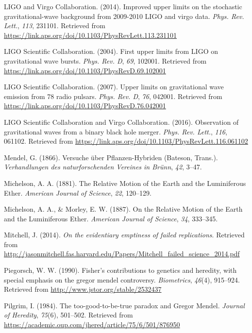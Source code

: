 \documentclass[english,floatsintext,man]{apa6}
\theoremstyle{definition}
\theoremstyle{definition}
\theoremstyle{definition}
\theoremstyle{remark}
\begin{document}
\hypertarget{ref-LIGO:2014}{}
LIGO and Virgo Collaboration. (2014). Improved upper limits on the
stochastic gravitational-wave background from 2009-2010 LIGO and virgo
data. \emph{Phys. Rev. Lett.}, \emph{113}, 231101. Retrieved from
\url{https://link.aps.org/doi/10.1103/PhysRevLett.113.231101}

\hypertarget{ref-LIGO:2004}{}
LIGO Scientific Collaboration. (2004). First upper limits from LIGO on
gravitational wave bursts. \emph{Phys. Rev. D}, \emph{69}, 102001.
Retrieved from \url{https://link.aps.org/doi/10.1103/PhysRevD.69.102001}

\hypertarget{ref-LIGO:2007}{}
LIGO Scientific Collaboration. (2007). Upper limits on gravitational
wave emission from 78 radio pulsars. \emph{Phys. Rev. D}, \emph{76},
042001. Retrieved from
\url{https://link.aps.org/doi/10.1103/PhysRevD.76.042001}

\hypertarget{ref-LIGO:2016}{}
LIGO Scientific Collaboration and Virgo Collaboration. (2016).
Observation of gravitational waves from a binary black hole merger.
\emph{Phys. Rev. Lett.}, \emph{116}, 061102. Retrieved from
\url{https://link.aps.org/doi/10.1103/PhysRevLett.116.061102}

\hypertarget{ref-Mendel:1866}{}
Mendel, G. (1866). Versuche über Pflanzen-Hybriden (Bateson, Trans.).
\emph{Verhandlungen des naturforschenden Vereines in Brünn}, \emph{42},
3--47.

\hypertarget{ref-Michelson:1881}{}
Michelson, A. A. (1881). The Relative Motion of the Earth and the
Luminiferous Ether. \emph{American Journal of Science}, \emph{22},
120--129.

\hypertarget{ref-Michelson:Morley:1887}{}
Michelson, A. A., \& Morley, E. W. (1887). On the Relative Motion of the
Earth and the Luminiferous Ether. \emph{American Journal of Science},
\emph{34}, 333--345.

\hypertarget{ref-Mitchell:2014}{}
Mitchell, J. (2014). \emph{On the evidentiary emptiness of failed
replications}. Retrieved from
\url{http://jasonmitchell.fas.harvard.edu/Papers/Mitchell_failed_science_2014.pdf}

\hypertarget{ref-Piegorsch:1990}{}
Piegorsch, W. W. (1990). Fisher's contributions to genetics and
heredity, with special emphasis on the gregor mendel controversy.
\emph{Biometrics}, \emph{46}(4), 915--924. Retrieved from
\url{http://www.jstor.org/stable/2532437}

\hypertarget{ref-Pilgrim:1984}{}
Pilgrim, I. (1984). The too-good-to-be-true paradox and Gregor Mendel.
\emph{Journal of Heredity}, \emph{75}(6), 501--502. Retrieved from
\url{https://academic.oup.com/jhered/article/75/6/501/876950}
\end{document}
